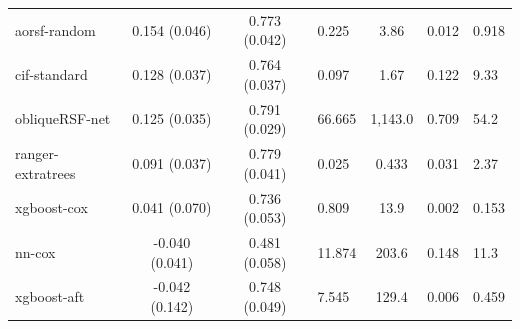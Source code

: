 \documentclass[twoside,11pt]{article}\usepackage[]{graphicx}\usepackage[]{xcolor}
\newenvironment{knitrout}{}{} %
\begin{document}
\begin{knitrout}
\begin{longtable}{lcclccl}
\hspace{1em}aorsf-random & 0.154 (0.046) & 0.773 (0.042) & 0.225 & 3.86 & 0.012 & 0.918\\
\hspace{1em}cif-standard & 0.128 (0.037) & 0.764 (0.037) & 0.097 & 1.67 & 0.122 & 9.33\\
\hspace{1em}obliqueRSF-net & 0.125 (0.035) & 0.791 (0.029) & 66.665 & 1,143.0 & 0.709 & 54.2\\
\hspace{1em}ranger-extratrees & 0.091 (0.037) & 0.779 (0.041) & 0.025 & 0.433 & 0.031 & 2.37\\
\hspace{1em}xgboost-cox & 0.041 (0.070) & 0.736 (0.053) & 0.809 & 13.9 & 0.002 & 0.153\\
\hspace{1em}nn-cox & -0.040 (0.041) & 0.481 (0.058) & 11.874 & 203.6 & 0.148 & 11.3\\
\hspace{1em}xgboost-aft & -0.042 (0.142) & 0.748 (0.049) & 7.545 & 129.4 & 0.006 & 0.459\\*
\end{longtable}

\end{knitrout}


\vskip 0.2in

\end{document}
